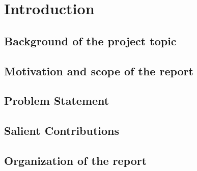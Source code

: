 \chapter{Introduction}

\section{Background of the project topic}

\section{Motivation and scope of the report}

\section{Problem Statement}

\section{Salient Contributions}

\section{Organization of the report}
